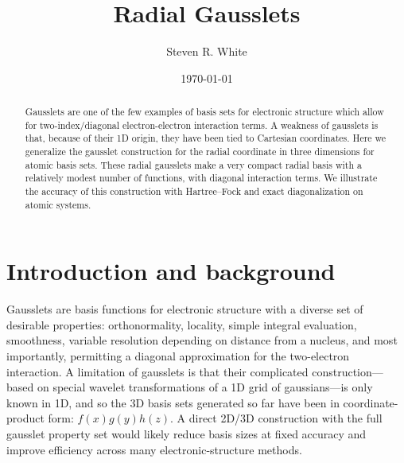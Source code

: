 \documentclass[aps,pra,reprint,longbibliography,nofootinbib]{revtex4-2}
\begin{document}
\title{Radial Gausslets}

\author{Steven R. White}
\date{\today}

\begin{abstract}
 Gausslets are one of the few examples of basis sets for electronic structure which allow for two-index/diagonal electron-electron interaction terms. %
 A weakness of gausslets is that, because of their 1D origin, they have been tied to Cartesian coordinates. Here we generalize the gausslet construction for the radial coordinate in three dimensions for atomic basis sets. These radial gausslets make a very compact radial basis with a relatively modest number of functions, with diagonal interaction terms.  We illustrate the accuracy of this construction with Hartree--Fock and exact diagonalization on atomic systems. 
\end{abstract}

\maketitle

\section{Introduction and background}
\label{sec:intro}
Gausslets\cite{White17,WhiteStoudenmire2019MultiSliced,QiuWhite2021Hybrid,White2023} are basis functions for electronic structure with a diverse set of desirable properties: orthonormality, locality, simple integral evaluation, smoothness, variable resolution depending on distance from a nucleus, and most importantly, permitting a diagonal approximation for the two-electron interaction. A limitation of gausslets is that their complicated construction---based on special wavelet transformations of a 1D grid of gaussians---is only known in 1D, and so the 3D basis sets generated so far have been in coordinate-product form:  $f(x) g(y) h(z)$. A direct 2D/3D construction with the full gausslet property set would likely reduce basis sizes at fixed accuracy and improve efficiency across many electronic-structure methods. 
\end{document}
